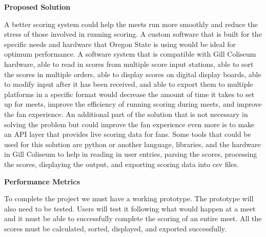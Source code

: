 \documentclass[letterpaper,10pt,draftclsnofoot,onecolumn,]{IEEEtran}
\begin{document}
\begin{center}
\textbf{Proposed Solution}\\
\end{center}
A better scoring system could help the meets run more smoothly and reduce the stress of those involved in running scoring. A custom software that is built for the specific needs and hardware that Oregon State is using would be ideal for optimum performance. A software system that is compatible with Gill Coliseum hardware, able to read in scores from multiple score input stations, able to sort the scores in multiple orders, able to display scores on digital display boards, able to modify input after it has been received, and able to export them to multiple platforms in a specific format would decrease the amount of time it takes to set up for meets, improve the efficiency of running scoring during meets, and improve the fan experience. An additional part of the solution that is not necessary in solving the problem but could improve the fan experience even more is to make an API layer that provides live scoring data for fans. Some tools that could be used for this solution are python or another language, libraries, and the hardware in Gill Coliseum to help in reading in user entries, parsing the scores, processing the scores, displaying the output, and exporting scoring data into csv files.\\

\begin{center}
\textbf{Performance Metrics}\\
\end{center}
To complete the project we must have a working prototype. The prototype will also need to be tested. Users will test it following what would happen at a meet and it must be able to successfully complete the scoring of an entire meet. All the scores must be calculated, sorted, displayed, and exported successfully.\\
\end{document}
